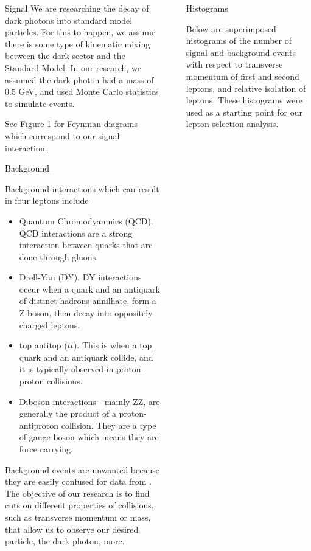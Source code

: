 \documentclass[final]{beamer}
\newlength{\sepwidth}
\newlength{\colwidth}
\newcommand{\separatorcolumn}{\begin{column}{\sepwidth}\end{column}}
\begin{document}
\begin{frame}[t]
\begin{columns}[t]
\begin{column}{\colwidth}
\begin{block}{Signal}
    We are researching the decay of dark photons into standard model particles. For this to happen, we assume there is some type of kinematic mixing between the dark sector and the Standard Model. In our research, we assumed the dark photon had a mass of 0.5 GeV, and used Monte Carlo statistics to simulate events.
    
    See Figure 1 for Feynman diagrams which correspond to our signal interaction.
    

  \end{block}

  \begin{block}{Background}

    Background interactions which can result in four leptons include 

    \begin{itemize}
      \item Quantum Chromodyanmics (QCD). QCD interactions are a strong interaction between quarks that are done through gluons. 
      \item Drell-Yan (DY). DY interactions occur when a quark and an antiquark of distinct hadrons annilhate, form a Z-boson, then decay into oppositely charged leptons.
      \item top antitop (\textbf{$t\overline{t}$}). This is when a top quark and an antiquark collide, and it is typically observed in proton-proton collisions. 
      \item Diboson interactions - mainly ZZ, are generally the product of a proton-antiproton collision. They are a type of gauge boson which means they are force carrying.
    \end{itemize}

    
    Background events are unwanted because they are easily confused for data from . The objective of our research is to find cuts on different properties of collisions, such as transverse momentum or mass, that allow us to observe our desired particle, the dark photon, more.

  \end{block}

\end{column}

\separatorcolumn

\begin{column}{\colwidth}

  \begin{block}{Histograms}

    Below are superimposed histograms of the number of signal and background events with respect to transverse momentum of first and second leptons, and relative isolation of leptons. These histograms were used as a starting point for our lepton selection analysis.
    

\end{block}
\end{column}
\end{columns}
\end{frame}
\end{document}
